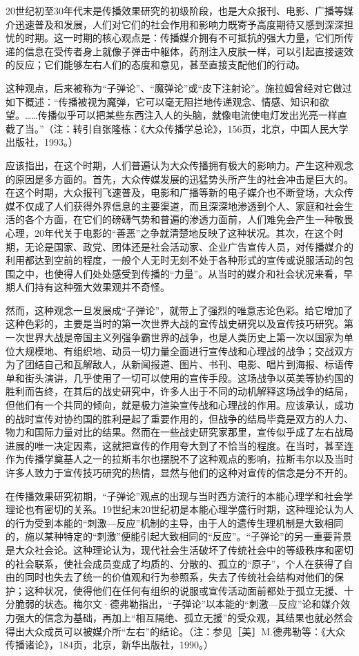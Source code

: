 \documentclass[UTF8,12pt]{ctexart}
\numberwithin{equation}{section} %
\numberwithin{figure}{section}
\numberwithin{table}{section}
\begin{document}
	20世纪初至30年代末是传播效果研究的初级阶段，也是大众报刊、电影、广播等媒介迅速普及和发展，人们对它们的社会作用和影响力既寄予高度期待又感到深深担忧的时期。这一时期的核心观点是：传播媒介拥有不可抵抗的强大力量，它们所传递的信息在受传者身上就像子弹击中躯体，药剂注入皮肤一样，可以引起直接速效的反应；它们能够左右人们的态度和意见，甚至直接支配他们的行动。
	
	这种观点，后来被称为“子弹论”、“魔弹论”或“皮下注射论”。施拉姆曾经对它做过如下概述：“传播被视为魔弹，它可以毫无阻拦地传递观念、情感、知识和欲望。……传播似乎可以把某些东西注入人的头脑，就像电流使电灯发出光亮一样直截了当。”（注：转引自张隆栋：《大众传播学总论》，156页，北京，中国人民大学出版社，1993。）
	
	应该指出，在这个时期，人们普遍认为大众传播拥有极大的影响力。产生这种观念的原因是多方面的。首先，大众传媒发展的迅猛势头所产生的社会冲击是巨大的。在这个时期，大众报刊飞速普及，电影和广播等新的电子媒介也不断登场，大众传媒不仅成了人们获得外界信息的主要渠道，而且深深地渗透到个人、家庭和社会生活的各个方面，在它们的磅礴气势和普遍的渗透力面前，人们难免会产生一种敬畏心理，20年代关于电影的“善恶”之争就清楚地反映了这种状况。其次，在这个时期，无论是国家、政党、团体还是社会活动家、企业广告宣传人员，对传播媒介的利用都达到空前的程度，一般个人无时无刻不处于各种形式的宣传或说服活动的包围之中，也使得人们处处感受到传播的“力量”。从当时的媒介和社会状况来看，早期人们持有这种强大效果观并不奇怪。
	
	然而，这种观念一旦发展成“子弹论”，就带上了强烈的唯意志论色彩。给它增加了这种色彩的，主要是当时的第一次世界大战的宣传战史研究以及宣传技巧研究。第一次世界大战是帝国主义列强争霸世界的战争，也是人类历史上第一次以国家为单位大规模地、有组织地、动员一切力量全面进行宣传战和心理战的战争；交战双方为了团结自己和瓦解敌人，从新闻报道、图片、书刊、电影、唱片到海报、标语传单和街头演讲，几乎使用了一切可以使用的宣传手段。这场战争以英美等协约国的胜利而告终，在其后的战史研究中，许多人出于不同的动机解释这场战争的结局，但他们有一个共同的倾向，就是极力渲染宣传战和心理战的作用。应该承认，成功的战时宣传对协约国的胜利是起了重要作用的，但战争的结局毕竟是双方的人力、物力和国际力量对比的结果。然而在一些战史研究家那里，宣传似乎成了左右战局进展的唯一决定因素，这就把宣传的作用夸大到了不恰当的程度。在当时，甚至连作为传播学奠基人之一的拉斯韦尔也摆脱不了这种观点的影响，拉斯韦尔以及当时许多人致力于宣传技巧研究的热情，显然与他们的这种对宣传的信念是分不开的。
	
	在传播效果研究初期，“子弹论”观点的出现与当时西方流行的本能心理学和社会学理论也有密切的关系。19世纪末20世纪初是本能心理学盛行时期，这种理论认为人的行为受到本能的“刺激—反应”机制的主导，由于人的遗传生理机制是大致相同的，施以某种特定的“刺激”便能引起大致相同的“反应”。“子弹论”的另一重要背景是大众社会论。这种理论认为，现代社会生活破坏了传统社会中的等级秩序和密切的社会联系，使社会成员变成了均质的、分散的、孤立的“原子”，个人在获得了自由的同时也失去了统一的价值观和行为参照系，失去了传统社会结构对他们的保护；这种状况，使得他们在任何有组织的说服或宣传活动面前都处于孤立无援、十分脆弱的状态。梅尔文·德弗勒指出，“子弹论”以本能的“刺激—反应”论和媒介效力强大的信念为基础，再加上“相互隔绝、孤立无援”的受众观，其结果也就必然会得出大众成员可以被媒介所“左右”的结论。（注：参见［美］M.德弗勒等：《大众传播诸论》，184页，北京，新华出版社，1990。）
	
\end{document}
